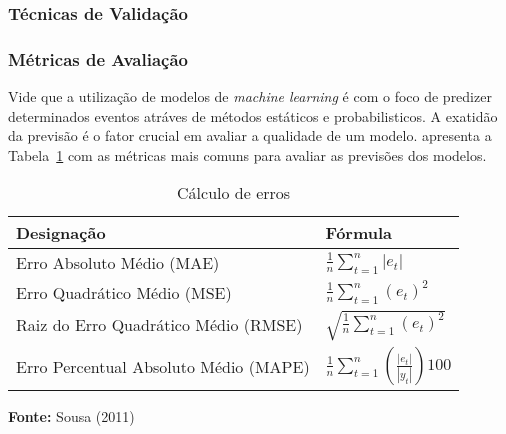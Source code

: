         

        \subsubsection{Técnicas de Validação}

        \subsubsection{Métricas de Avaliação}
            Vide que a utilização de modelos de \emph{machine learning} é com o foco de predizer determinados eventos atráves
            de métodos estáticos e probabilisticos. A exatidão da previsão é o fator crucial em avaliar a qualidade de um modelo.
             apresenta a Tabela~\ref{fig:tabela-metricas} com as métricas mais comuns para avaliar as previsões
            dos modelos.
            
            \begin{center}
                \begin{table}[h!]
                    \centering
                    \caption{Cálculo de erros}
                    \label{tab:calculo_erros}
                    \begin{tabular}{ll}
                        \toprule
                        \textbf{Designação} & \textbf{Fórmula} \\ 
                        \midrule
                        Erro Absoluto Médio (MAE) & $\frac{1}{n} \sum_{t=1}^{n} |e_t|$ \\[8pt]
                        Erro Quadrático Médio (MSE) & $\frac{1}{n} \sum_{t=1}^{n} (e_t)^2$ \\[8pt]
                        Raiz do Erro Quadrático Médio (RMSE) & $\sqrt{\frac{1}{n} \sum_{t=1}^{n} (e_t)^2}$ \\[8pt]
                        Erro Percentual Absoluto Médio (MAPE) & $\frac{1}{n} \sum_{t=1}^{n} \left(\frac{|e_t|}{|y_t|}\right) 100$ \\ 
                        \bottomrule
                    \end{tabular}
                    
                    \bigskip
                    \small \textbf{Fonte:} Sousa (2011)
                    \label{fig:tabela-metricas}
                \end{table}
            \end{center}
            
